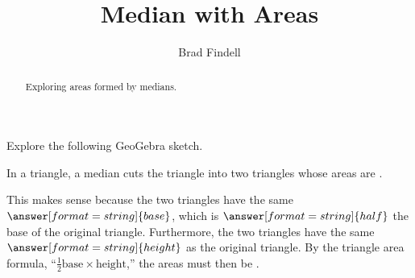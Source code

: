 \documentclass[handout,nooutcomes]{ximera}
\title{Median with Areas}
\author{Brad Findell}
\begin{document}
\begin{abstract}
Exploring areas formed by medians. 
\end{abstract}
\maketitle




\begin{problem}
Explore the following GeoGebra sketch.  
\begin{center}  
\end{center}
In a triangle, a median cuts the triangle into two triangles whose areas are .  

This makes sense because the two triangles have the same $\answer[format=string]{base}$, which is 
$\answer[format=string]{half}$ the base of the original triangle.  Furthermore, the two triangles have the same $\answer[format=string]{height}$ as the original triangle.  By the triangle area formula, ``$\frac{1}{2} \textrm{base} \times \textrm{height}$,'' the areas must then be .

\end{problem}
\end{document}

